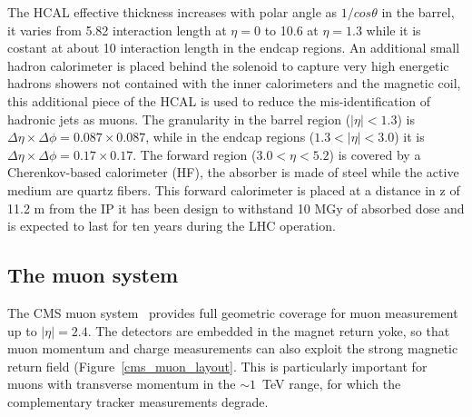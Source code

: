 The HCAL effective thickness increases with polar angle as $1/cos\theta$ in the barrel, 
it varies from 5.82 interaction length at $\eta = 0$ to 10.6 at $\eta = 1.3$ while it is
costant at about 10 interaction length in the endcap regions.
An additional  small hadron
calorimeter is placed behind the solenoid to capture very high energetic hadrons showers not
contained with the inner calorimeters and the magnetic coil, this additional piece of the HCAL
is used to reduce the mis-identification of hadronic jets as muons. The
granularity in the barrel region ($|\eta|<1.3$) is $\Delta\eta × \Delta\phi = 0.087 \times 0.087$, while
in the endcap regions ($1.3<|\eta|<3.0$) it is
$\Delta\eta × \Delta\phi = 0.17 \times 0.17$. The forward region ($3.0 < \eta < 5.2$)
is covered by a Cherenkov-based calorimeter (HF), the absorber is made of steel while the
active medium are quartz fibers.
This forward calorimeter is placed at a distance in z of 11.2 m from the IP it has been design
to withstand 10 MGy of absorbed dose and is expected to last for ten years during the LHC operation.

\subsection{The muon system}
The CMS muon system~\cite{muon_tp} provides full geometric coverage for muon measurement up to $|\eta| = 2.4$.
The detectors are embedded in the magnet return yoke, so that muon momentum and charge
measurements can also exploit the strong magnetic return field (Figure~\ref{cms_muon_layout}.
This is particularly important
for muons with transverse momentum in the $\sim 1$~TeV range, for which the complementary tracker
measurements degrade.

